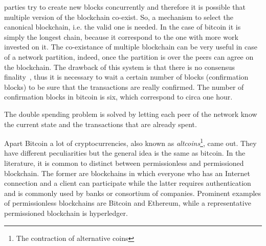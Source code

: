 parties try to create new blocks concurrently and therefore it is possible that 
multiple version of the blockchain co-exist. So, a mechanism to select the 
canonical blockchain, i.e. the valid one is needed. In the case of bitcoin
it is simply the longest chain, because it correspond to the one with more work
invested on it. The co-existance of multiple blockchain can be very useful
in case of a network partition, indeed, once the partition is over the 
peers can agree on the blockchain. The drawback of this system is that
there is no consensus finality~\cite{bib:the-quest}, thus it is necessary to
wait a certain number of blocks (confirmation blocks) to be sure that the 
transactions are really confirmed. The number of confirmation blocks in bitcoin
is six, which correspond to circa one hour.

The double spending problem is solved by letting each peer of the network
know the current state and the transactions that are already spent.


Apart Bitcoin a lot of cryptocurrencies, also known as 
\emph{altcoins}\footnote{The contraction of alternative coins}, came out.
They have different peculiarities but the general idea is the same as bitcoin.
In the literature, it is common to distinct between permissionless and 
permissioned blockchain. The former are blockchains in which everyone who has 
an Internet connection and a client can participate while the latter requires 
authentication and is commonly used by banks or consortium of companies. 
Prominent examples of permissionless blockchains are Bitcoin and Ethereum, 
while a representative permissioned blockchain is hyperledger.







